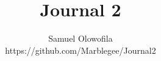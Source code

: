 \documentclass[12pt]{article}
\begin{document}
\title{Journal 2}
\author{Samuel Olowofila \\
https://github.com/Marblegee/Journal2}
\date{}
\maketitle





\nocite{*}
\printbibliography[heading=none]


\nocite{*}
\printbibliography[heading=none]
\end{document}
